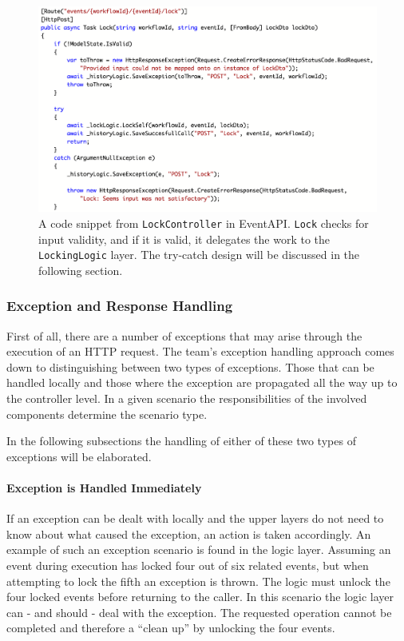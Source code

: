 \begin{figure}[h!]
\centering
\includegraphics[width=\linewidth]{figures/LockController}
\caption{\label{fig:LockController}A code snippet from \texttt{LockController} in EventAPI. \texttt{Lock} checks for input validity, and if it is valid, it delegates the work to the \texttt{LockingLogic} layer. The try-catch design will be discussed in the following section. }
\end{figure}


\subsubsection{Exception and Response Handling}
First of all, there are a number of exceptions that may arise through the execution of an HTTP request. The team's exception handling approach comes down to distinguishing between two types of exceptions. Those that can be handled locally and those where the exception are propagated all the way up to the controller level. In a given scenario the responsibilities of the involved components determine the scenario type. 

In the following subsections the handling of either of these two types of exceptions will be elaborated.

\paragraph{Exception is Handled Immediately}
If an exception can be dealt with locally and the upper layers do not need to know about what caused the exception, an action is taken accordingly. An example of such an exception scenario is found in the logic layer. Assuming an event during execution has locked four out of six related events, but when attempting to lock the fifth an exception is thrown. The logic must unlock the four locked events before returning to the caller. In this scenario the logic layer can - and should - deal with the exception. The requested operation cannot be completed and therefore a “clean up” by unlocking the four events.\\

